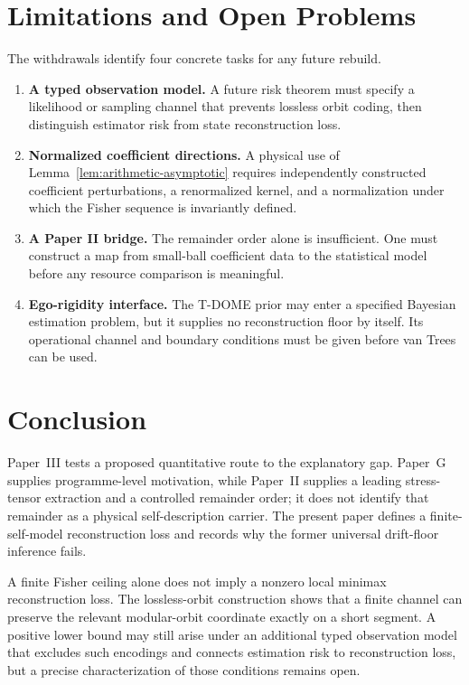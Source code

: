 \documentclass[12pt]{article}
\theoremstyle{definition}
\theoremstyle{remark}
\begin{document}
\section{Limitations and Open Problems}\label{sec:7}

The withdrawals identify four concrete tasks for any future rebuild.

\begin{enumerate}
\item \textbf{A typed observation model.} A future risk theorem must
specify a likelihood or sampling channel that prevents lossless orbit
coding, then distinguish estimator risk from state reconstruction loss.

\item \textbf{Normalized coefficient directions.} A physical use of
Lemma~\ref{lem:arithmetic-asymptotic} requires independently constructed
coefficient perturbations, a renormalized kernel, and a normalization
under which the Fisher sequence is invariantly defined.

\item \textbf{A Paper II bridge.} The remainder order alone is
insufficient. One must construct a map from small-ball coefficient data
to the statistical model before any resource comparison is meaningful.

\item \textbf{Ego-rigidity interface.} The T-DOME prior may enter a
specified Bayesian estimation problem, but it supplies no reconstruction
floor by itself. Its operational channel and boundary conditions must be
given before van Trees can be used.
\end{enumerate}

\section{Conclusion}\label{sec:8}

Paper~III tests a proposed quantitative route to the explanatory gap.
Paper~G supplies programme-level motivation, while Paper~II supplies a
leading stress-tensor extraction and a controlled remainder order; it
does not identify that remainder as a physical self-description carrier.
The present paper defines a finite-self-model reconstruction loss and
records why the former universal drift-floor inference fails.

A finite Fisher ceiling alone does not imply a nonzero local minimax
reconstruction loss. The lossless-orbit construction shows that a finite
channel can preserve the relevant modular-orbit coordinate exactly on a
short segment. A positive lower bound may still arise under an additional
typed observation model that excludes such encodings and connects
estimation risk to reconstruction loss, but a precise characterization
of those conditions remains open.
\end{document}
